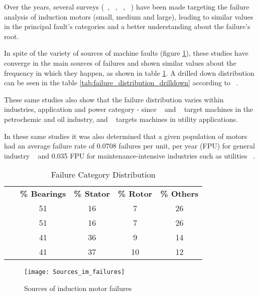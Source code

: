 Over the years, several surveys (~\cite{Bonnett2010}, ~\cite{Thorsen1995}, ~\cite{Mccoy1986}, ~\cite{Bonnett1992}) have been made targeting the failure analysis of induction motors (small, medium and large), leading to similar values in the principal fault's categories and a better understanding about the failure's root.

In spite of the variety of sources of machine faults (figure \ref{fig:Sources_im_failures}), these studies have converge in the main sources of failures and shown similar values about the frequency in which they happen, as shown in table \ref{tab:failure_distribution}. A drilled down distribution can be seen in the table \ref{tab:failure_distribution_drilldown} according to ~\cite{Mccoy1986}.

These same studies also show that the failure distribution varies within industries, application and power category - since ~\cite{Bonnett2010} and ~\cite{Thorsen1995} target machines in the petrochemic and oil industry, and ~\cite{Mccoy1986} targets machines in utility applications.


In these same studies it was also determined that a given population of motors had an average failure rate of 0.0708 failures per unit, per year (FPU) for general industry ~\cite{Reliability1987} and 0.035 FPU for maintenance-intensive industries such as utilities ~\cite{Mccoy1986}.

\begin{table}[]
\centering
\caption{Failure Category Distribution}
\label{tab:failure_distribution}
\begin{tabular}{ccccc}
\multicolumn{1}{c}{\textbf{}} & \multicolumn{1}{c}{\textbf{\% Bearings}} & \multicolumn{1}{c}{\textbf{\% Stator}} & \multicolumn{1}{c}{\textbf{\% Rotor}} & \multicolumn{1}{c}{\textbf{\% Others}}  \\
~\cite{Bonnett2010}  & 51 & 16 & 7 & 26 \\ 
~\cite{Thorsen1995}  & 51 & 16 & 7 & 26 \\
~\cite{Mccoy1986} 	 & 41 & 36 & 9 & 14 \\
~\cite{Bonnett1992}  & 41 & 37 & 10 & 12 \\                              
\end{tabular}
\end{table}



\begin{figure}[htbp]
	\centering
	\texttt{[image: Sources\_im\_failures]}
	\caption{Sources of induction motor failures}
	\label{fig:Sources_im_failures}
\end{figure}

